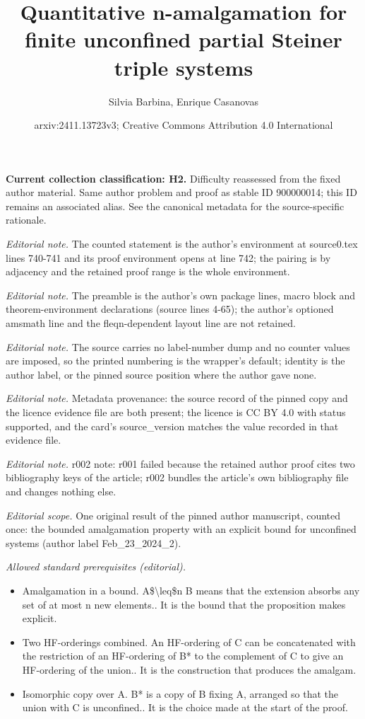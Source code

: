 \documentclass[10pt,a4paper]{article}
\title{Quantitative n-amalgamation for finite unconfined partial Steiner triple systems}
\author{Silvia Barbina, Enrique Casanovas}
\date{arxiv:2411.13723v3; Creative Commons Attribution 4.0 International}
\theoremstyle{note}
\begin{document}
\maketitle
\par\medskip\noindent\textbf{Current collection classification: H2.} Difficulty reassessed from the fixed author material. Same author problem and proof as stable ID 900000014; this ID remains an associated alias. See the canonical metadata for the source-specific rationale.\par\medskip

\noindent\textit{Editorial note.} The counted statement is the author's environment at source0.tex lines 740-741 and its proof environment opens at line 742; the pairing is by adjacency and the retained proof range is the whole environment.\par\medskip
\noindent\textit{Editorial note.} The preamble is the author's own package lines, macro block and theorem-environment declarations (source lines 4-65); the author's optioned amsmath line and the fleqn-dependent layout line are not retained.\par\medskip
\noindent\textit{Editorial note.} The source carries no label-number dump and no counter values are imposed, so the printed numbering is the wrapper's default; identity is the author label, or the pinned source position where the author gave none.\par\medskip
\noindent\textit{Editorial note.} Metadata provenance: the source record of the pinned copy and the licence evidence file are both present; the licence is CC BY 4.0 with status supported, and the card's source\_version matches the value recorded in that evidence file.\par\medskip
\noindent\textit{Editorial note.} r002 note: r001 failed because the retained author proof cites two bibliography keys of the article; r002 bundles the article's own bibliography file and changes nothing else.\par\medskip
\noindent\textit{Editorial scope.} One original result of the pinned author manuscript, counted once: the bounded amalgamation property with an explicit bound for unconfined systems (author label Feb\_23\_2024\_2).\par\medskip
\noindent\textit{Allowed standard prerequisites (editorial).}\begin{itemize}
\item Amalgamation in a bound. A\$\textbackslash{}leq\$n B means that the extension absorbs any set of at most n new elements.. It is the bound that the proposition makes explicit.
\item Two HF-orderings combined. An HF-ordering of C can be concatenated with the restriction of an HF-ordering of B* to the complement of C to give an HF-ordering of the union.. It is the construction that produces the amalgam.
\item Isomorphic copy over A. B* is a copy of B fixing A, arranged so that the union with C is unconfined.. It is the choice made at the start of the proof.
\end{itemize}\medskip
\end{document}

